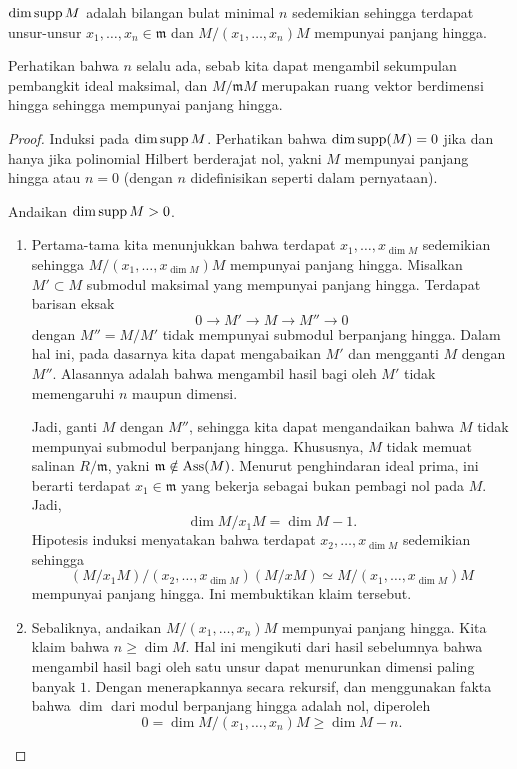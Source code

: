\begin{proposition} 
$\mathrm{dim} \operatorname{supp} M$ adalah bilangan bulat minimal $n$ sedemikian sehingga terdapat unsur-unsur $x_1,
\dots, x_n \in \mathfrak{m}$ dan $M/(x_1 , \dots, x_n) M$ mempunyai panjang hingga. 
\end{proposition} 
Perhatikan bahwa $n$ selalu ada, sebab kita dapat mengambil sekumpulan pembangkit
ideal maksimal, dan $M/\mathfrak{m}M $ merupakan ruang vektor berdimensi hingga sehingga
mempunyai panjang hingga.
\begin{proof} 
Induksi pada $\mathrm{dim} \operatorname{supp} M$. Perhatikan bahwa $\mathrm{dim} \operatorname{supp}(M)=0$ jika dan hanya jika
polinomial Hilbert berderajat nol, yakni $M$ mempunyai panjang hingga atau $n=0$
(dengan $n$ didefinisikan seperti dalam pernyataan). 

Andaikan $\mathrm{dim} \operatorname{supp} M > 0$. \begin{enumerate}
\item Pertama-tama kita menunjukkan bahwa terdapat $x_1, \dots, x_{\dim M}$
sedemikian sehingga $M/(x_1, \dots, x_{\dim M})M$ mempunyai panjang hingga. 
Misalkan $M' \subset M$ submodul maksimal yang mempunyai panjang hingga. Terdapat
barisan eksak
\[ 0 \to M' \to M \to M'' \to 0  \]
dengan $M'' = M/M'$ tidak mempunyai submodul berpanjang hingga. Dalam hal ini, pada dasarnya kita dapat
mengabaikan $M'$ dan mengganti $M$ dengan $M''$. Alasannya adalah bahwa mengambil hasil bagi
oleh $M'$ tidak memengaruhi $n$ maupun dimensi. 

Jadi, ganti $M$ dengan
$M''$, sehingga kita dapat mengandaikan bahwa $M$ tidak mempunyai submodul berpanjang hingga. Khususnya,
$M$ tidak memuat salinan $R/\mathfrak{m}$, yakni $\mathfrak{m}
\notin \operatorname{Ass}(M)$. 
Menurut penghindaran ideal prima, ini berarti terdapat $x_1 \in \mathfrak{m}$ yang bekerja sebagai
bukan pembagi nol pada $M$. Jadi,
\[ \dim M/x_1M = \dim M -1.  \]
Hipotesis induksi menyatakan bahwa terdapat $x_2, \dots, x_{\dim M}$ sedemikian sehingga
$$(M/x_1 M)/(x_2, \dots, x_{\dim M}) (M/xM) \simeq M/(x_1, \dots, x_{\dim M})M $$
mempunyai panjang hingga. Ini membuktikan klaim tersebut.
\item Sebaliknya, andaikan $M/(x_1, \dots, x_n)M$ mempunyai panjang hingga.
Kita klaim bahwa $n \geq \dim M$. Hal ini mengikuti dari hasil sebelumnya
bahwa mengambil hasil bagi oleh satu unsur dapat menurunkan dimensi paling banyak
$1$. Dengan menerapkannya secara rekursif, dan menggunakan fakta bahwa $\dim$ dari modul
berpanjang hingga adalah nol, diperoleh
\[ 0 = \dim M/(x_1 , \dots, x_n )M \geq \dim M -n. \]
\end{enumerate}
\end{proof} 


